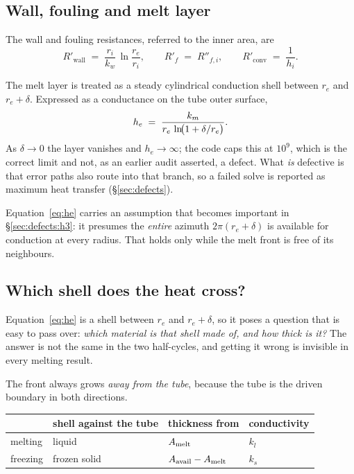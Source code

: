 \subsection{Wall, fouling and melt layer}

The wall and fouling resistances, referred to the inner area, are
\begin{equation}
  R'_{\mathrm{wall}} \;=\; \frac{r_{i}}{k_{w}}\,\ln\!\frac{r_{e}}{r_{i}},
  \qquad
  R'_{f} \;=\; R''_{f,i},
  \qquad
  R'_{\mathrm{conv}} \;=\; \frac{1}{h_{i}} .
  \label{eq:R-wall}
\end{equation}

The melt layer is treated as a steady cylindrical conduction shell between
$r_{e}$ and $r_{e}+\delta$. Expressed as a conductance on the tube outer
surface,
\begin{equation}
  h_{e} \;=\; \frac{k_{m}}{r_{e}\,\ln\!\bigl(1+\delta/r_{e}\bigr)} .
  \label{eq:he}
\end{equation}
As $\delta\to 0$ the layer vanishes and $h_{e}\to\infty$; the code caps this at
$10^{9}$, which is the correct limit and not, as an earlier audit asserted, a
defect. What \emph{is} defective is that error paths also route into that
branch, so a failed solve is reported as maximum heat transfer
(\S\ref{sec:defects}).

Equation~\eqref{eq:he} carries an assumption that becomes important in
\S\ref{sec:defects:h3}: it presumes the \emph{entire} azimuth
$2\pi(r_{e}+\delta)$ is available for conduction at every radius. That holds
only while the melt front is free of its neighbours.

\subsection{Which shell does the heat cross?}
\label{sec:network:shell}

Equation~\eqref{eq:he} is a shell between $r_{e}$ and $r_{e}+\delta$, so it
poses a question that is easy to pass over: \emph{which material is that shell
made of, and how thick is it?} The answer is not the same in the two
half-cycles, and getting it wrong is invisible in every melting result.

The front always grows \emph{away from the tube}, because the tube is the driven
boundary in both directions.

\begin{center}
\begin{tabular}{@{}l l l l@{}}
\toprule
 & shell against the tube & thickness from & conductivity \\
\midrule
melting  & liquid        & $A_{\mathrm{melt}}$               & $k_{l}$ \\
freezing & frozen solid  & $A_{\mathrm{avail}}-A_{\mathrm{melt}}$ & $k_{s}$ \\
\bottomrule
\end{tabular}
\end{center}


